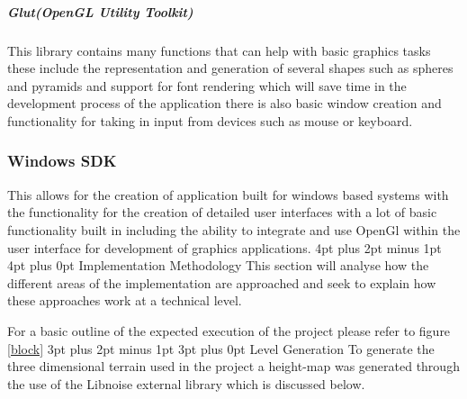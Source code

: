 \documentclass[12pt,a4paper]{article}
\makeatletter
\renewcommand\subsection{\@startsection {subsection}{1}{2mm} %
                               {3pt plus 2pt minus 1pt} %
                               {3pt plus 0pt} %
                               {\normalfont\bfseries}}
\renewcommand\section{\@startsection {section}{1}{0mm} %
                               {4pt plus 2pt minus 1pt} %
                               {4pt plus 0pt} %
                               {\bfseries}}
\makeatother
\begin{document}
\subparagraph{Glut(OpenGL Utility Toolkit)} 
This library contains many functions that can help with basic graphics tasks these include the representation and generation of several shapes such as spheres and pyramids and support for font rendering which will save time in the development process of the application there is also basic window creation and functionality for taking in input from devices such as mouse or keyboard.   

\subsubsection{Windows SDK}
This allows for the creation of application built for windows based systems with the functionality for the creation of detailed user interfaces with a lot of basic functionality built in including the ability to integrate and use OpenGl within the user interface for development of graphics applications.  
\newpage
\section{Implementation Methodology}
This section will analyse how the different areas of the implementation are approached and seek to explain how these approaches work at a technical level.

For a basic outline of the expected execution of the project please refer to figure \ref{block}
\subsection{Level Generation}
To generate the three dimensional terrain used in the project a height-map was generated through the use of the Libnoise external library which is discussed below.
\end{document}
